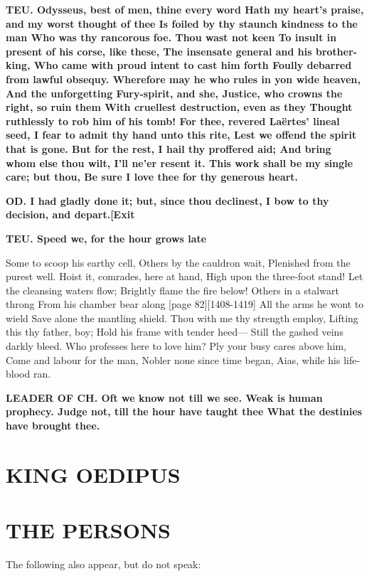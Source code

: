 \documentclass[11pt,letter]{book}
\begin{document}
\par \textbf{TEU. Odysseus, best of men, thine every word Hath my heart’s praise, and my worst thought of thee Is foiled by thy staunch kindness to the man Who was thy rancorous foe. Thou wast not keen To insult in present of his corse, like these, The insensate general and his brother-king, Who came with proud intent to cast him forth Foully debarred from lawful obsequy. Wherefore may he who rules in yon wide heaven, And the unforgetting Fury-spirit, and she, Justice, who crowns the right, so ruin them With cruellest destruction, even as they Thought ruthlessly to rob him of his tomb! For thee, revered Laërtes’ lineal seed, I fear to admit thy hand unto this rite, Lest we offend the spirit that is gone. But for the rest, I hail thy proffered aid; And bring whom else thou wilt, I’ll ne’er resent it. This work shall be my single care; but thou, Be sure I love thee for thy generous heart.}
\par 

\par \textbf{OD. I had gladly done it; but, since thou declinest, I bow to thy decision, and depart.[Exit}
\par 

\par \textbf{TEU. Speed we, for the hour grows late}
\par   Some to scoop his earthy cell, Others by the cauldron wait, Plenished from the purest well. Hoist it, comrades, here at hand, High upon the three-foot stand! Let the cleansing waters flow; Brightly flame the fire below! Others in a stalwart throng From his chamber bear along [page 82][1408-1419] All the arms he wont to wield Save alone the mantling shield. Thou with me thy strength employ, Lifting this thy father, boy; Hold his frame with tender heed— Still the gashed veins darkly bleed. Who professes here to love him? Ply your busy cares above him, Come and labour for the man, Nobler none since time began, Aias, while his life-blood ran.

\par \textbf{LEADER OF CH. Oft we know not till we see. Weak is human prophecy. Judge not, till the hour have taught thee What the destinies have brought thee.}
\par 
\section{KING OEDIPUS}\section{THE PERSONS}
\par  The following also appear, but do not speak:
 
\end{document}
